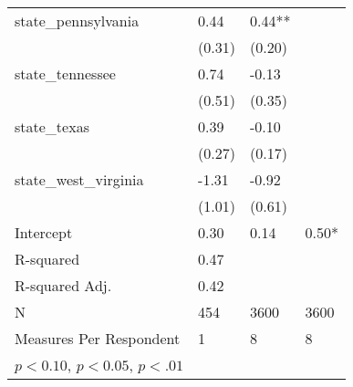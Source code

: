 \begin{table}
\begin{center}
\begin{tabular}{llll}
    state\_pennsylvania                            & 0.44                   & 0.44**       &                \\
                                                   & (0.31)                 & (0.20)       &                \\
    state\_tennessee                               & 0.74                   & -0.13        &                \\
                                                   & (0.51)                 & (0.35)       &                \\
    state\_texas                                   & 0.39                   & -0.10        &                \\
                                                   & (0.27)                 & (0.17)       &                \\
    state\_west\_virginia                          & -1.31                  & -0.92        &                \\
                                                   & (1.01)                 & (0.61)       &                \\
    Intercept                                      & 0.30                   & 0.14         & 0.50*          \\
    \hline
    R-squared                                      & 0.47                   &              &                \\
    R-squared Adj.                                 & 0.42                   &              &                \\
    N                                              & 454                    & 3600         & 3600           \\
    Measures Per Respondent                        & 1                      & 8            & 8              \\
    \hline
    \footnotesize \sym{*} \(p<0.10\), \sym{**} \(p<0.05\), \sym{***} \(p<.01\)
    \hline
    \end{tabular}
    \end{center}
    \end{table}